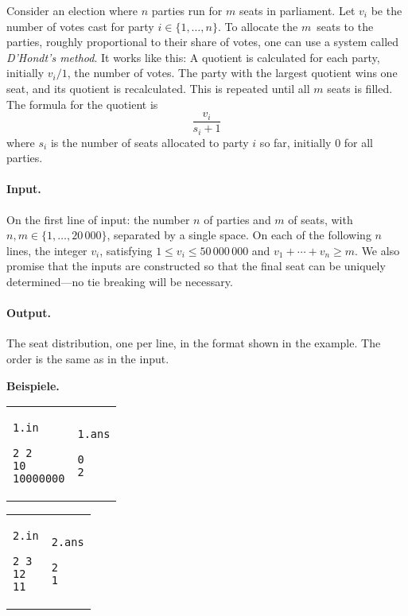 \documentclass{uebung_cs}
\begin{document}
Consider an election where $n$ parties run for $m$ seats in parliament.
Let $v_i$ be the number of votes cast for party $i\in\{1,\ldots,n\}$.
To allocate the $m$~seats to the parties, roughly proportional to their share of votes, one can use a system called \emph{D'Hondt's method}.
It works like this:
A quotient is calculated for each party, initially $v_i/1$, the number of votes.
The party with the largest quotient wins one seat, and its quotient is recalculated.
This is repeated until all $m$ seats is filled.
The formula for the quotient is
\[\frac{v_i}{s_i+1}\]
where $s_i$ is the number of seats allocated to party $i$ so far, initially $0$ for all parties.

\paragraph{Input.}
On the first line of input: the number $n$ of parties and $m$ of seats, with $n,m\in\{1 ,\ldots, 20\,000\}$, separated by a single space.
On each of the following $n$ lines, the integer $v_i$, satisfying $1\leq v_i\leq 50\,000\,000$  and $v_1+\cdots +v_n\geq m$.
We also promise that the inputs are constructed so that the final seat can be uniquely determined---no tie breaking will be necessary.

\paragraph{Output.}
The seat distribution, one per line, in the format shown in the example.
The order is the same as in the input.

\textbf{Beispiele.}\\
\begin{tabular}{p{}p{}}
\texttt{1.in}
\begin{verbatim}
2 2
10
10000000
\end{verbatim}
&
\texttt{1.ans}
\begin{verbatim}
0
2
\end{verbatim}
\end{tabular}

\begin{tabular}{p{}p{}}
\texttt{2.in}
\begin{verbatim}
2 3
12
11
\end{verbatim}
&
\texttt{2.ans}
\begin{verbatim}
2
1
\end{verbatim}
\end{tabular}
\end{document}
